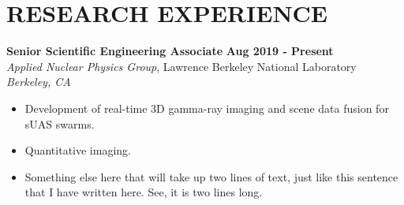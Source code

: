 \section{\small{RESEARCH EXPERIENCE}}

\textbf{Senior Scientific Engineering Associate} \hfill \textbf{Aug 2019 - Present} \\
\textsl{Applied Nuclear Physics Group}, Lawrence Berkeley National Laboratory \hfill \textsl{Berkeley, CA} \\[-2.8ex]
\vspace{2pt}
\begin{itemize}[leftmargin=4ex] \itemsep -2pt
    \item Development of real-time 3D gamma-ray imaging and scene data fusion for sUAS swarms.
    \item Quantitative imaging.
    \item Something else here that will take up two lines of text, just like this sentence that I have written here. See, it is two lines long.
\end{itemize}

